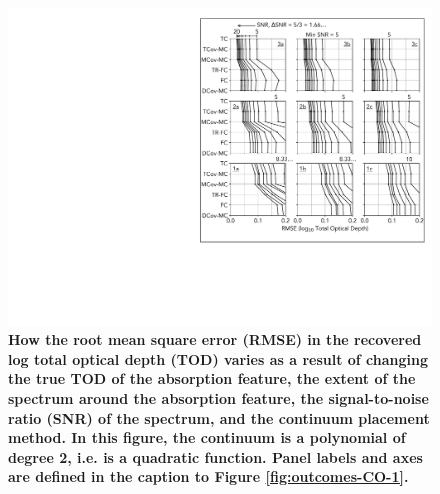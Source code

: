 \documentclass[trackchanges]{aastex62}
\begin{document}
{\begin{figure}
  \includegraphics[width=\linewidth]{figures/annotated_co2_RMSEs_vs_SNR.pdf}
  \caption{
  \bf
  How the root mean square error (RMSE) in the recovered log total optical depth (TOD) varies as a result of changing the true TOD of the absorption feature, the extent of the spectrum around the absorption feature, the signal-to-noise ratio (SNR) of the spectrum, and the continuum placement method.
  In this figure, the continuum is a polynomial of degree 2, i.e. is a quadratic function.
  Panel labels and axes are defined in the caption to Figure \ref{fig:outcomes-CO-1}.
  }
  \label{fig:outcomes-CO-2}
\end{figure}

}
\end{document}
